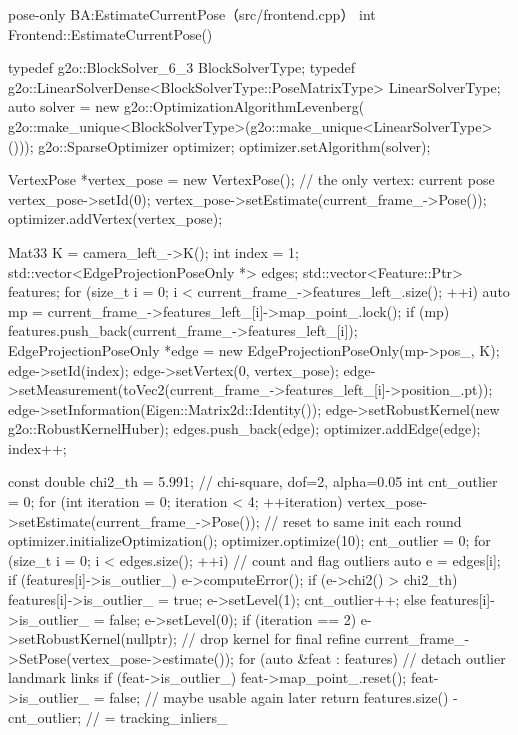\begin{codebox}[C++]{pose-only BA:EstimateCurrentPose（src/frontend.cpp）}
int Frontend::EstimateCurrentPose() {
    typedef g2o::BlockSolver_6_3 BlockSolverType;
    typedef g2o::LinearSolverDense<BlockSolverType::PoseMatrixType> LinearSolverType;
    auto solver = new g2o::OptimizationAlgorithmLevenberg(
        g2o::make_unique<BlockSolverType>(g2o::make_unique<LinearSolverType>()));
    g2o::SparseOptimizer optimizer;
    optimizer.setAlgorithm(solver);

    VertexPose *vertex_pose = new VertexPose();   // the only vertex: current pose
    vertex_pose->setId(0);
    vertex_pose->setEstimate(current_frame_->Pose());
    optimizer.addVertex(vertex_pose);

    Mat33 K = camera_left_->K();
    int index = 1;
    std::vector<EdgeProjectionPoseOnly *> edges;
    std::vector<Feature::Ptr> features;
    for (size_t i = 0; i < current_frame_->features_left_.size(); ++i) {
        auto mp = current_frame_->features_left_[i]->map_point_.lock();
        if (mp) {
            features.push_back(current_frame_->features_left_[i]);
            EdgeProjectionPoseOnly *edge = new EdgeProjectionPoseOnly(mp->pos_, K);
            edge->setId(index);
            edge->setVertex(0, vertex_pose);
            edge->setMeasurement(toVec2(current_frame_->features_left_[i]->position_.pt));
            edge->setInformation(Eigen::Matrix2d::Identity());
            edge->setRobustKernel(new g2o::RobustKernelHuber);
            edges.push_back(edge);
            optimizer.addEdge(edge);
            index++;
        }
    }

    const double chi2_th = 5.991;                 // chi-square, dof=2, alpha=0.05
    int cnt_outlier = 0;
    for (int iteration = 0; iteration < 4; ++iteration) {
        vertex_pose->setEstimate(current_frame_->Pose());  // reset to same init each round
        optimizer.initializeOptimization();
        optimizer.optimize(10);
        cnt_outlier = 0;
        for (size_t i = 0; i < edges.size(); ++i) {        // count and flag outliers
            auto e = edges[i];
            if (features[i]->is_outlier_) e->computeError();
            if (e->chi2() > chi2_th) {
                features[i]->is_outlier_ = true;  e->setLevel(1); cnt_outlier++;
            } else {
                features[i]->is_outlier_ = false; e->setLevel(0);
            }
            if (iteration == 2) e->setRobustKernel(nullptr); // drop kernel for final refine
        }
    }
    current_frame_->SetPose(vertex_pose->estimate());
    for (auto &feat : features) {                  // detach outlier landmark links
        if (feat->is_outlier_) {
            feat->map_point_.reset();
            feat->is_outlier_ = false;             // maybe usable again later
        }
    }
    return features.size() - cnt_outlier;          // = tracking_inliers_
}
\end{codebox}

